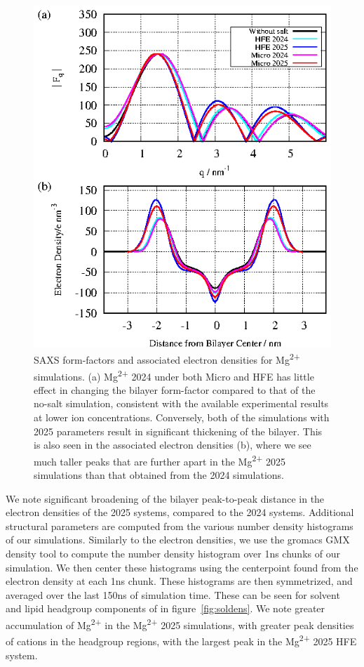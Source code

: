 \documentclass[journal=langd5,manuscript=article]{achemso}
\newcommand{\mg}{Mg\textsuperscript{2+}}
\begin{document}
\begin{figure}[H]
    \caption{SAXS form-factors and associated electron densities for \mg{} simulations. (a) \mg{ 2024} under both Micro
and HFE has little effect in changing the bilayer form-factor compared to that of the no-salt simulation, consistent with the available experimental results at lower ion concentrations. 
Conversely, both of the simulations with 2025 parameters result in significant thickening of the bilayer. 
This is also seen in the associated electron densities (b), where we see much taller peaks that are further apart in the \mg{ 2025} simulations
than that obtained from the 2024 simulations.}
    \label{fig:formfactors}
    \includegraphics[height=0.5\textheight]{figures/Figure_4.eps}
\end{figure}
We note significant broadening of the bilayer peak-to-peak distance in the electron densities of the 2025 systems, compared to the 2024 systems. 
Additional structural parameters are computed from the various number density histograms of our simulations. Similarly to the electron densities, we use the gromacs GMX density tool to compute the number density histogram over 1ns chunks of our simulation. We then center these histograms using the centerpoint found from the electron
density at each 1ns chunk. 
These histograms are then symmetrized, and averaged over the last 150ns of simulation time. 
These can be seen for solvent and lipid headgroup components of in figure~\ref{fig:soldens}.
We note greater accumulation of \mg{} in the \mg{ 2025} simulations, with greater peak densities of cations in the headgroup regions, with the largest peak in the \mg{ 2025} HFE system. 
\end{document}
